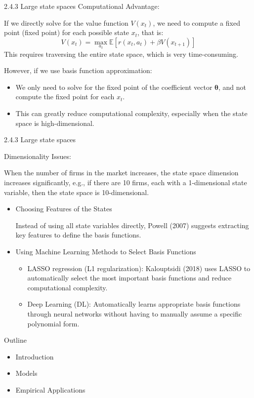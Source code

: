 \documentclass[aspectratio=169]{beamer}  %
\begin{document}
\begin{frame}
{2.4.3 Large state spaces}
Computational Advantage:

If we directly solve for the value function \( V(x_t) \), we need to compute a fixed point (fixed point) for each possible state \( x_t \), that is:
\[
V(x_t) = \max_{a_t} \mathbb{E}[r(x_t, a_t) + \beta V(x_{t+1})]
\]
This requires traversing the entire state space, which is very time-consuming.

However, if we use basis function approximation:
\begin{itemize}
    \item We only need to solve for the fixed point of the coefficient vector \( \boldsymbol{\theta} \), and not compute the fixed point for each \( x_t \).
    \item This can greatly reduce computational complexity, especially when the state space is high-dimensional.
\end{itemize}
\end{frame}


\begin{frame}
{2.4.3 Large state spaces}

Dimensionality Issues:

When the number of firms in the market increases, the state space dimension increases significantly, e.g., if there are 10 firms, each with a 1-dimensional state variable, then the state space is 10-dimensional.
\begin{itemize}
    \item Choosing Features of the States
    
    Instead of using all state variables directly, Powell (2007) suggests extracting key features to define the basis functions.
    \item Using Machine Learning Methods to Select Basis Functions
    \begin{itemize}
        \item LASSO regression (L1 regularization): Kalouptsidi (2018) uses LASSO to automatically select the most important basis functions and reduce computational complexity.
        \item Deep Learning (DL): Automatically learns appropriate basis functions through neural networks without having to manually assume a specific polynomial form.
    \end{itemize}
\end{itemize}
\end{frame}

\begin{frame}{Outline}
    \begin{itemize}
        \item Introduction
        \item Models
        \item Empirical Applications
    \end{itemize}
\end{frame}
\end{document}
